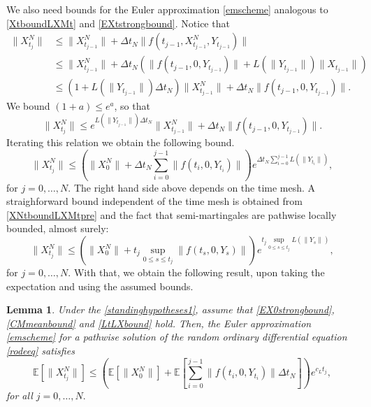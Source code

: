 \documentclass[reqno,12pt]{amsart}
\theoremstyle{plain} %
\newtheorem{lemma}{Lemma}[section]
\theoremstyle{definition} %
\begin{document}
We also need bounds for the Euler approximation \cref{emscheme} analogous to \cref{XtboundLXMt} and \cref{EXtstrongbound}. Notice that
\begin{align*}
    \|X_{t_j}^N\| & \leq \|X_{t_{j-1}}^N\| + \Delta t_N \|f(t_{j-1}, X_{t_{j-1}}^N, Y_{t_{j-1}})\| \\
    & \leq \|X_{t_{j-1}}^N\| + \Delta t_N (\|f(t_{j-1}, 0, Y_{t_{j-1}})\| + L(\|Y_{t_{j-1}}\|)\|X_{t_{j-1}}\|) \\
    & \leq \left(1 + L(\|Y_{t_{j-1}}\|)\Delta t_N\right)\|X_{t_{j-1}}^N\| + \Delta t_N \|f(t_{j-1},0,Y_{t_{j-1}})\|.
\end{align*}
We bound $(1 + a) \leq e^a$, so that
\[
    \|X_{t_j}^N\| \leq e^{L(\|Y_{t_{j-1}}\|)\Delta t_N}\|X_{t_{j-1}}^N\| + \Delta t_N \|f(t_{j-1},0,Y_{t_{j-1}})\|.
\]
Iterating this relation we obtain the following bound.
\begin{equation}
    \label{XNtboundLXMtpre}
    \|X_{t_j}^N\| \leq \left(\|X_0^N\| + \Delta t_N \sum_{i=0}^{j-1} \|f(t_i,0,Y_{t_i})\|\right)e^{\Delta t_N \sum_{i=0}^{j-1} L(\|Y_{t_i}\|)},
\end{equation}
for $j = 0, \ldots, N.$ The right hand side above depends on the time mesh. A straighforward bound independent of the time mesh is obtained from \cref{XNtboundLXMtpre} and the fact that semi-martingales are pathwise locally bounded, almost surely:
\begin{equation}
    \label{XNtboundLXMt}
    \|X_{t_j}^N\| \leq \left(\|X_0^N\| + t_j \sup_{0\leq s\leq t_j} \|f(t_s,0,Y_s)\|\right)e^{t_j \sup_{0\leq s\leq t_j} L(\|Y_s\|)},
\end{equation}
for $j = 0, \ldots, N.$ With that, we obtain the following result, upon taking the expectation and using the assumed bounds.
\begin{lemma}
    \label{lemXNtmeanboundLXMt}
    Under the \cref{standinghypotheses1}, assume that \cref{EX0strongbound}, \cref{CMmeanbound} and \cref{LtLXbound} hold. Then, the Euler approximation \cref{emscheme} for a pathwise solution of the random ordinary differential equation \cref{rodeeq} satisfies
    \begin{equation}
        \label{XNtmeanboundLXMt}
        \mathbb{E}\left[\|X_{t_j}^N\|\right] \leq \left(\mathbb{E}\left[\|X_0^N\|\right] + \mathbb{E}\left[\sum_{i=0}^{j-1} \|f(t_i,0,Y_{t_i})\|\Delta t_N \right] \right)e^{c_L t_j},
    \end{equation}
    for all $j = 0, \ldots, N.$
\end{lemma}
\end{document}
